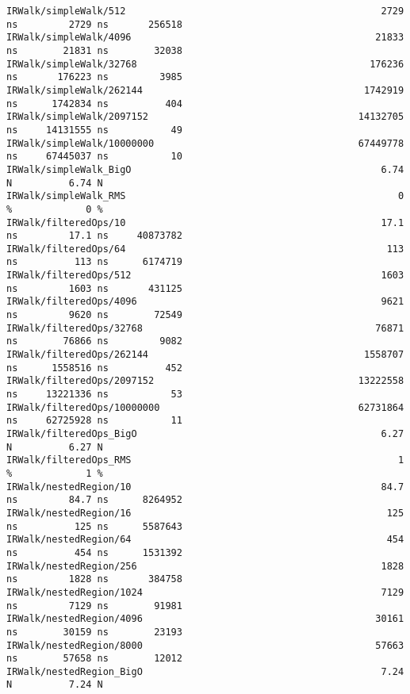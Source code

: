 \begin{code}
\begin{verbatim}
IRWalk/simpleWalk/512                                             2729 ns         2729 ns       256518
IRWalk/simpleWalk/4096                                           21833 ns        21831 ns        32038
IRWalk/simpleWalk/32768                                         176236 ns       176223 ns         3985
IRWalk/simpleWalk/262144                                       1742919 ns      1742834 ns          404
IRWalk/simpleWalk/2097152                                     14132705 ns     14131555 ns           49
IRWalk/simpleWalk/10000000                                    67449778 ns     67445037 ns           10
IRWalk/simpleWalk_BigO                                            6.74 N          6.74 N
IRWalk/simpleWalk_RMS                                                0 %             0 %
IRWalk/filteredOps/10                                             17.1 ns         17.1 ns     40873782
IRWalk/filteredOps/64                                              113 ns          113 ns      6174719
IRWalk/filteredOps/512                                            1603 ns         1603 ns       431125
IRWalk/filteredOps/4096                                           9621 ns         9620 ns        72549
IRWalk/filteredOps/32768                                         76871 ns        76866 ns         9082
IRWalk/filteredOps/262144                                      1558707 ns      1558516 ns          452
IRWalk/filteredOps/2097152                                    13222558 ns     13221336 ns           53
IRWalk/filteredOps/10000000                                   62731864 ns     62725928 ns           11
IRWalk/filteredOps_BigO                                           6.27 N          6.27 N
IRWalk/filteredOps_RMS                                               1 %             1 %
IRWalk/nestedRegion/10                                            84.7 ns         84.7 ns      8264952
IRWalk/nestedRegion/16                                             125 ns          125 ns      5587643
IRWalk/nestedRegion/64                                             454 ns          454 ns      1531392
IRWalk/nestedRegion/256                                           1828 ns         1828 ns       384758
IRWalk/nestedRegion/1024                                          7129 ns         7129 ns        91981
IRWalk/nestedRegion/4096                                         30161 ns        30159 ns        23193
IRWalk/nestedRegion/8000                                         57663 ns        57658 ns        12012
IRWalk/nestedRegion_BigO                                          7.24 N          7.24 N

\end{verbatim}
\end{code}
